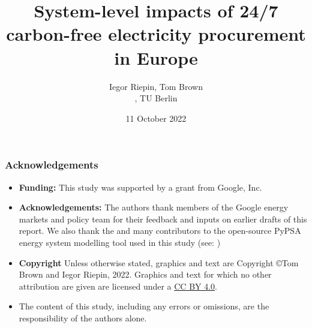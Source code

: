 

\title{System-level impacts of 24/7 carbon-free electricity procurement in Europe}

\author{
  Iegor Riepin, Tom Brown\\
  , TU Berlin
}

\date{11 October 2022}




\maketitle


\begin{frame}
  \frametitle{Acknowledgements}

  \begin{itemize}
    \item {\bf Funding:} This study was supported by a grant from Google, Inc. 
    \item {\bf Acknowledgements:} The authors thank members of the Google energy markets and policy team 
    for their feedback and inputs on earlier drafts of this report. 
    We also thank the  and many contributors to the open-source 
    PyPSA energy system modelling tool used in this study (see: )
    \item 
    {\bf Copyright} Unless otherwise stated, graphics and text are Copyright \copyright Tom Brown and Iegor Riepin, 2022.
    Graphics and text for which no other attribution are given are licensed under a 
    \href{https://creativecommons.org/licenses/by/4.0/}{CC BY 4.0}.  {\footnotesize \ccby} 
    \item The content of this study, including any errors or omissions, are the responsibility
    of the authors alone.
  \end{itemize}

\end{frame}


